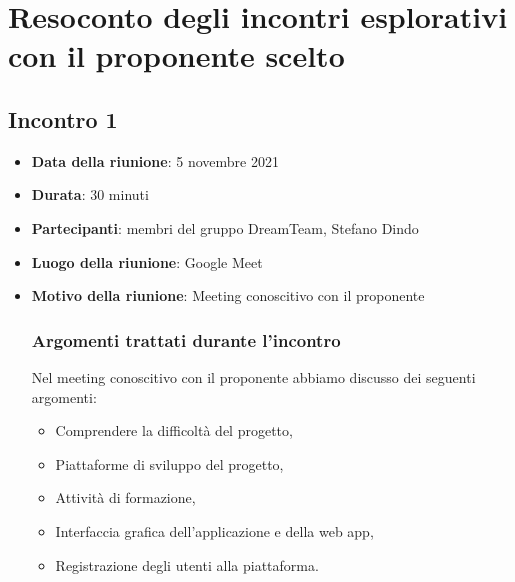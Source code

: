 \section{Resoconto degli incontri esplorativi con il proponente scelto}
\subsection{Incontro 1}
\begin{itemize}
\item \textbf{Data della riunione}: 5 novembre 2021
\item \textbf{Durata}: 30 minuti
\item \textbf{Partecipanti}: membri del gruppo DreamTeam,  Stefano Dindo
\item \textbf{Luogo della riunione}: Google Meet
\item \textbf{Motivo della riunione}: Meeting conoscitivo con il proponente
\subsubsection{Argomenti trattati durante l'incontro}
Nel meeting conoscitivo con il proponente abbiamo discusso dei seguenti argomenti:
	\begin{itemize}
		\item Comprendere la difficoltà del progetto,
		\item Piattaforme di sviluppo del progetto,
		\item Attività di formazione,
		\item Interfaccia grafica dell’applicazione e della web app,
		\item Registrazione degli utenti alla piattaforma.
	\end{itemize}
\end{itemize} 


